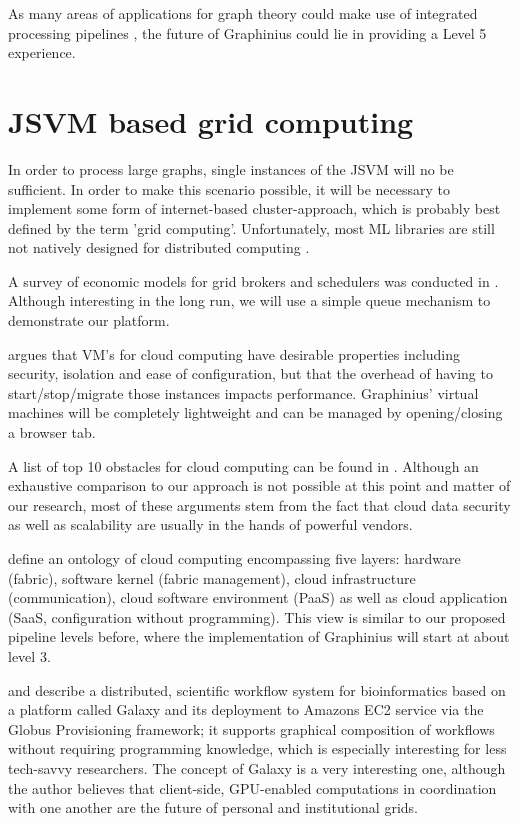 As many areas of applications for graph theory could make use of integrated processing pipelines 
\citep{MLPipelines}, the future of Graphinius could lie in providing a Level 5 experience.


\section{JSVM based grid computing}
\label{sect:jsvm_grid}

In order to process large graphs, single instances of the JSVM will no be sufficient. In order to make this scenario possible, it will be necessary to implement some form of internet-based cluster-approach, which is probably best defined by the term 'grid computing'. Unfortunately, most ML libraries are still not natively designed for distributed computing \citep{MLPipelineMLlib}.

A survey of economic models for grid brokers and schedulers was conducted in \citep{Abramson2002}. Although interesting in the long run, we will use a simple queue mechanism to demonstrate our platform.

\citep{Huang2006} argues that VM's for cloud computing have desirable properties including security, isolation and ease of configuration, but that the overhead of having to start/stop/migrate those instances impacts performance. Graphinius' virtual machines will be completely lightweight and can be managed by opening/closing a browser tab.

A list of top 10 obstacles for cloud computing can be found in \citep{Armbrust2010}. Although an exhaustive comparison to our approach is not possible at this point and matter of our research, most of these arguments stem from the fact that cloud data security as well as scalability are usually in the hands of powerful vendors.

\citep{Youseff2008} define an ontology of cloud computing encompassing five layers: hardware (fabric), software kernel (fabric management), cloud infrastructure (communication), cloud software environment (PaaS) as well as cloud application (SaaS, configuration without programming). This view is similar to our proposed pipeline levels before, where the implementation of Graphinius will start at about level 3.

\citep{Liu2012} and \citep{Liu2014} describe a distributed, scientific workflow system for bioinformatics based on a platform called Galaxy and its deployment to Amazons EC2 service via the Globus Provisioning framework; it supports graphical composition of workflows without requiring programming knowledge, which is especially interesting for less tech-savvy researchers. The concept of Galaxy is a very interesting one, although the author believes that client-side, GPU-enabled computations in coordination with one another are the future of personal and institutional grids.


